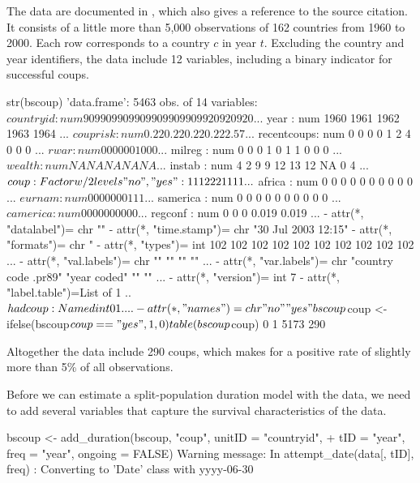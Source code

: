 The data are documented in , which also gives a reference to the source citation. It consists of a little more than 5,000 observations of 162 countries from 1960 to 2000. Each row corresponds to a country $c$ in year $t$. Excluding the country and year identifiers, the data include 12 variables, including a binary indicator for successful coups. 

\begin{example}
  str(bscoup)
  'data.frame':	5463 obs. of  14 variables:
  $ countryid  : num  909 909 909 909 909 909 909 920 920 920 ...
  $ year       : num  1960 1961 1962 1963 1964 ...
  $ couprisk   : num  0.22 0.22 0.22 0.22 2.57 ...
  $ recentcoups: num  0 0 0 0 1 2 4 0 0 0 ...
  $ rwar       : num  0 0 0 0 0 0 1 0 0 0 ...
  $ milreg     : num  0 0 0 1 0 1 1 0 0 0 ...
  $ wealth     : num  NA NA NA NA NA ...
  $ instab     : num  4 2 9 9 12 13 12 NA 0 4 ...
  $ coup       : Factor w/ 2 levels "no","yes": 1 1 1 2 2 2 1 1 1 1 ...
  $ africa     : num  0 0 0 0 0 0 0 0 0 0 ...
  $ eurnam     : num  0 0 0 0 0 0 0 1 1 1 ...
  $ samerica   : num  0 0 0 0 0 0 0 0 0 0 ...
  $ camerica   : num  0 0 0 0 0 0 0 0 0 0 ...
  $ regconf    : num  0 0 0 0.019 0.019 ...
  - attr(*, "datalabel")= chr ""
  - attr(*, "time.stamp")= chr "30 Jul 2003 12:15"
  - attr(*, "formats")= chr  "%
  - attr(*, "types")= int  102 102 102 102 102 102 102 102 102 102 ...
  - attr(*, "val.labels")= chr  "" "" "" "" ...
  - attr(*, "var.labels")= chr  "country code .pr89" "year coded" "" "" ...
  - attr(*, "version")= int 7
  - attr(*, "label.table")=List of 1
  ..$ hadcoup: Named int  0 1
  .. ..- attr(*, "names")= chr  "no" "yes"
  bscoup$coup <- ifelse(bscoup$coup == "yes", 1, 0)
  table(bscoup$coup)
  0    1
  5173  290 
\end{example}

Altogether the data include 290 coups, which makes for a positive rate of slightly more than 5\% of all observations. 

Before we can estimate a split-population duration model with the data, we need to add several variables that capture the survival characteristics of the data.

\begin{example}
  bscoup <- add_duration(bscoup, "coup", unitID = "countryid", 
  +    tID = "year", freq = "year", ongoing = FALSE)
  Warning message:
  In attempt_date(data[, tID], freq) :
  Converting to 'Date' class with yyyy-06-30
\end{example}

